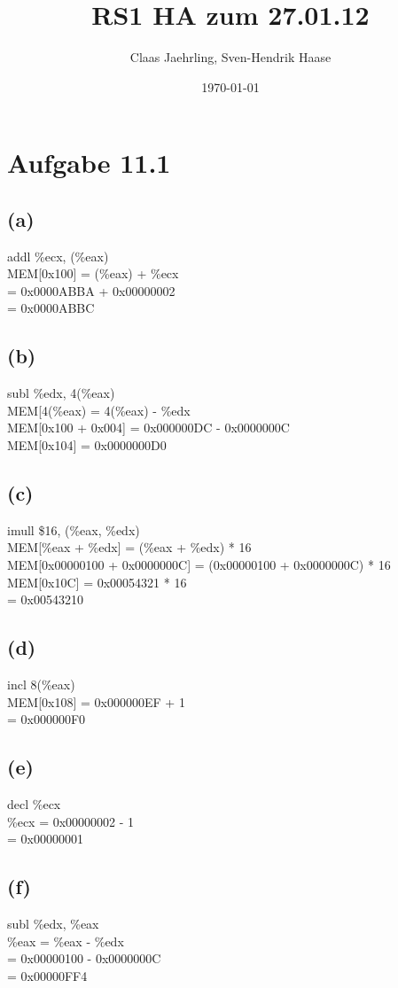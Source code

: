 \documentclass[12pt]{article}
\author{Claas Jaehrling, Sven-Hendrik Haase}
\title{RS1 HA zum 27.01.12}
\date{\today}
\begin{document}
\setcounter{secnumdepth}{0}
\maketitle

\section{Aufgabe 11.1}
\subsection{(a)}
addl \%ecx, (\%eax) \\
MEM[0x100] = (\%eax) + \%ecx \\
= 0x0000ABBA + 0x00000002 \\
= 0x0000ABBC
\subsection{(b)}
subl \%edx, 4(\%eax) \\
MEM[4(\%eax) = 4(\%eax) - \%edx \\
MEM[0x100 + 0x004] = 0x000000DC - 0x0000000C \\
MEM[0x104] = 0x0000000D0
\subsection{(c)}
imull \$16, (\%eax, \%edx) \\
MEM[\%eax + \%edx] = (\%eax + \%edx) * 16 \\
MEM[0x00000100 + 0x0000000C] = (0x00000100 + 0x0000000C) * 16 \\
MEM[0x10C] = 0x00054321 * 16 \\
= 0x00543210
\subsection{(d)}
incl 8(\%eax) \\
MEM[0x108] = 0x000000EF + 1 \\
= 0x000000F0
\subsection{(e)}
decl \%ecx \\
\%ecx = 0x00000002 - 1 \\
= 0x00000001
\subsection{(f)}
subl \%edx, \%eax \\
\%eax = \%eax - \%edx \\
= 0x00000100 - 0x0000000C \\
= 0x00000FF4
\end{document}
